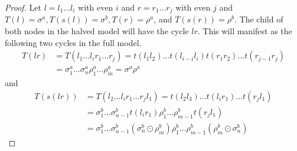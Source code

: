 \begin{proof}
    Let $l = l_1 \dots l_i$ with even $i$ and $r = r_1 \dots r_j$ with even $j$ and $T(l) = \sigma^a, T(s(l)) = \sigma^b, T(r) = \rho^a$, and $T(s(r)) = \rho^b$.
    The child of both nodes in the halved model will have the cycle $lr$.
    This will manifest as the following two cycles in the full model.
    \begin{align*}
        T(lr) & = T(l_1 \dots l_i r_1 \dots r_j) = t(l_1l_2) \dots t(l_{i-i}l_i) t(r_1r_2) \dots t(r_{j-1}r_j) \\
              & = \sigma^a_1 \dots \sigma^a_n \rho^a_1 \dots \rho^a_m = \sigma^a\rho^a
    \end{align*}
    and
    \begin{align*}
        T(s(lr)) & = T(l_2 \dots l_i r_1 \dots r_j l_1) = t(l_2l_3) \dots t(l_ir_1) \dots t(r_jl_1)  \\
                 & = \sigma^b_1 \dots \sigma^b_{n-1} t(l_ir_1) \rho^b_1 \dots \rho^b_{m-1} t(r_jl_1) \\
                 & = \sigma^b_1 \dots \sigma^b_{n-1} \left(\sigma^b_n \odot \rho^b_m\right)
        \rho^b_1 \dots \rho^b_{m-1} \left(\rho^b_m \odot \sigma^b_n\right)
    \end{align*}
\end{proof}